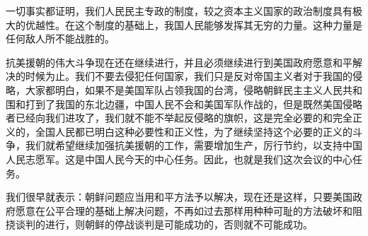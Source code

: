 一切事实都证明，我们人民民主专政的制度，较之资本主义国家的政治制度具有极大的优越性。在这个制度的基础上，我国人民能够发挥其无穷的力量。这种力量是任何敌人所不能战胜的。

抗美援朝的伟大斗争现在还在继续进行，并且必须继续进行到美国政府愿意和平解决的时候为止。我们不要去侵犯任何国家，我们只是反对帝国主义者对于我国的侵略，大家都明白，如果不是美国军队占领我国的台湾，侵略朝鲜民主主义人民共和围和打到了我国的东北边疆，中国人民不会和美国军队作战的，但是既然美国侵略者已经向我们进攻了，我们就不能不举起反侵略的旗帜，这是完全必要的和完全正义的，全国人民都已明白这种必要性和正义性，为了继续坚持这个必要的正义的斗争，我们就希望继续加强抗美援朝的工作，需要增加生产，厉行节约，以支持中国人民志愿军。这是中国人民今天的中心任务。因此，也就是我们这次会议的中心任务。

我们很早就表示：朝鲜问题应当用和平方法予以解决，现在还是这样，只要美国政府愿意在公平合理的基础上解决问题，不再如过去那样用种种可耻的方法破坏和阻挠谈判的进行，则朝鲜的停战谈判是可能成功的，否则就不可能成功。

